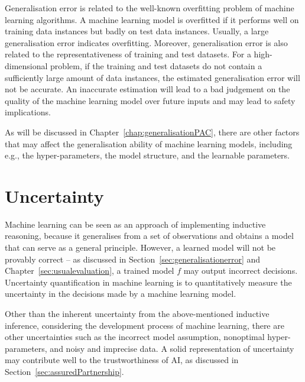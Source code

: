 Generalisation error is related to the well-known overfitting problem of machine learning algorithms. A machine learning model is overfitted if it performs  well on training data instances but badly on test data instances. Usually, a large generalisation error indicates overfitting. Moreover, generalisation error is also related to the representativeness of training and test datasets. For a high-dimensional problem, if the training and test datasets do not contain a sufficiently large amount of data instances, the estimated generalisation error will not be accurate. An inaccurate estimation will lead to a bad judgement on the quality of the machine learning model over future inputs and may lead to safety implications. 

As will be discussed in Chapter~\ref{chap:generalisationPAC}, there are other factors that may affect the generalisation ability of machine learning models, including e.g., the hyper-parameters, the model structure, and the learnable parameters. 


\section{Uncertainty}\label{sec:uncertainty}

Machine learning can be seen as an approach of implementing inductive reasoning, because it generalises from a set of observations and obtains a model that can serve as a general principle. However, a learned model will not be provably correct -- as discussed in Section~\ref{sec:generalisationerror} and Chapter~\ref{sec:usualevaluation}, a trained model $f$ may output incorrect decisions. Uncertainty quantification in machine learning is to quantitatively measure the uncertainty in the decisions made by a machine learning model. 

Other than the inherent uncertainty from the above-mentioned inductive inference, considering the development process of machine learning, there are other uncertainties such as the incorrect model assumption, nonoptimal hyper-parameters, and noisy and imprecise data. A solid representation of uncertainty may contribute well to the trustworthiness of AI, as discussed in Section~\ref{sec:assuredPartnership}.  

